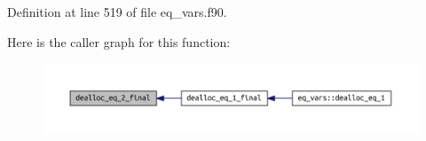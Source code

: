 Definition at line 519 of file eq\+\_\+vars.\+f90.

Here is the caller graph for this function\+:
\nopagebreak
\begin{figure}[H]
\begin{center}
\leavevmode
\includegraphics[width=350pt]{eq__vars_8f90_a0485e4116f0b0004f9a06ed86ac624aa_icgraph}
\end{center}
\end{figure}
